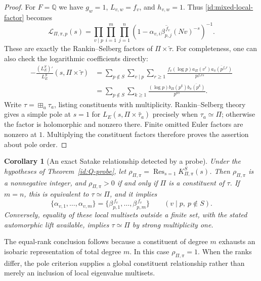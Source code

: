 \documentclass[11pt,reqno]{amsart}
\numberwithin{equation}{section}
\newtheorem{corollary}[theorem]{Corollary}
\theoremstyle{definition}
\theoremstyle{remark}
\newcommand{\Q}{\mathbb Q}
\begin{document}
\begin{proof}
For $F=\Q$ we have $g_w=1$, $L_{v,w}=f_v$, and $h_{v,w}=1$.
Thus \eqref{id:mixed-local-factor} becomes
\[
 \mathscr L_{\Pi,\pi,p}(s)=
 \prod_{v\mid p}\prod_{i=1}^{m}\prod_{j=1}^{n}
 (1-\alpha_{v,i}\overline{\beta_{p,j}^{\,f_v}}(Nv)^{-s})^{-1}.
\]
These are exactly the Rankin--Selberg factors of $\Pi\times\widetilde\tau$.
For completeness, one can also check the logarithmic coefficients directly:
\begin{align*}
 -\frac{(L_E^S)'}{L_E^S}(s,\Pi\times\widetilde\tau)
 &=\sum_{p\notin S}\sum_{v\mid p}\sum_{r\ge1}
 \frac{f_v(\log p)a_\Pi(v^r)\overline{a_\pi(p^{f_vr})}}{p^{f_vrs}}\\
 &=\sum_{p\notin S}\sum_{k\ge1}
 \frac{(\log p)b_\Pi(p^k)\overline{b_\pi(p^k)}}{p^{ks}}.
\end{align*}
Write $\tau=\boxplus_a\tau_a$, listing constituents with multiplicity.
Rankin--Selberg theory gives a simple pole at $s=1$ for
$L_E(s,\Pi\times\widetilde{\tau_a})$ precisely when $\tau_a\simeq\Pi$;
otherwise the factor is holomorphic and nonzero there. Finite omitted
Euler factors are nonzero at $1$. Multiplying the constituent factors
therefore proves the assertion about pole order.
\end{proof}

\begin{corollary}[An exact Satake relationship detected by a probe]
\label{id:Satake-detection}
Under the hypotheses of Theorem~\ref{id:Q-probe}, let
$\rho_{\Pi,\pi}=\operatorname*{Res}_{s=1}K_{\Pi,\pi}^S(s)$.
Then $\rho_{\Pi,\pi}$ is a nonnegative integer, and
$\rho_{\Pi,\pi}>0$ if and only if $\Pi$ is a constituent of $\tau$.
If $m=n$, this is equivalent to $\tau\simeq\Pi$, and it implies
\begin{equation}\label{id:Satake-detected-equality}
 \{\alpha_{v,1},\ldots,\alpha_{v,m}\}
 =\{\beta_{p,1}^{\,f_v},\ldots,\beta_{p,m}^{\,f_v}\}
 \qquad(v\mid p,\ p\notin S).
\end{equation}
Conversely, equality of these local multisets outside a finite set, with
the stated automorphic lift available, implies $\tau\simeq\Pi$ by strong
multiplicity one.
\end{corollary}

The equal-rank conclusion follows because a constituent of degree $m$
exhausts an isobaric representation of total degree $m$. In this case
$\rho_{\Pi,\pi}=1$. When the ranks differ, the pole criterion supplies a
global constituent relationship rather than merely an inclusion of
local eigenvalue multisets.
\end{document}
